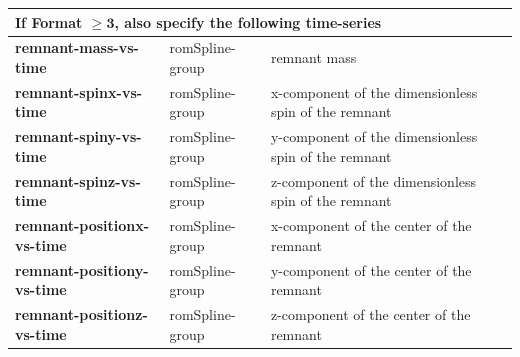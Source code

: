 \documentclass[11pt,tightenlines,article,amssymb,amsmath,amsfonts,superscriptaddress,nofootinbib]{revtex4}
\begin{document}
\begin{longtable}{|p{4cm}|p{2.5cm}|p{9.6cm}|}
\hline

\multicolumn{3}{|l|}{
  \rule[-.7em]{0pt}{2em}
       {\bf If Format \boldmath $\mathbf{\ge 3}$, also specify the following time-series}}\\ \hline

\textbf{remnant-mass-vs-time} & romSpline-group &  remnant mass\\
\textbf{remnant-spinx-vs-time} & romSpline-group & x-component of the dimensionless spin of the remnant \\
\textbf{remnant-spiny-vs-time} & romSpline-group & y-component of the dimensionless spin of the remnant \\
\textbf{remnant-spinz-vs-time} & romSpline-group & z-component of the dimensionless spin of the remnant \\
\textbf{remnant-positionx-vs-time} & romSpline-group & x-component of the center of the remnant \\
\textbf{remnant-positiony-vs-time} & romSpline-group & y-component of the center of the remnant \\
\textbf{remnant-positionz-vs-time} & romSpline-group & z-component of the center of the remnant 
\end{longtable}











\end{document}
